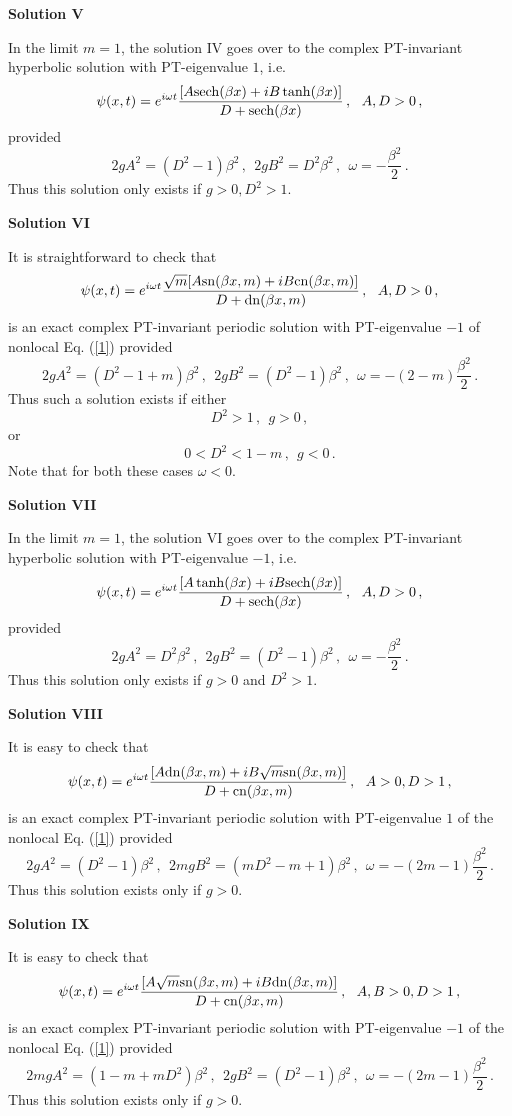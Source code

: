 \documentclass[11pt]{article}
\newcommand{\be}{\begin{equation}}
\newcommand{\ee}{\end{equation}}
\newcommand{\sn}{{\rm sn}}
\newcommand{\dn}{{\rm dn}}
\newcommand{\cn}{{\rm cn}}
\newcommand{\sech}{{\rm sech}}
\begin{document}
{\bf Solution V}

In the limit $m = 1$, the solution IV goes over to the complex 
PT-invariant hyperbolic solution with PT-eigenvalue $1$, i.e.
\be\label{15}
\psi(x,t) = e^{i\omega t} \frac{[A\sech(\beta x)+iB\tanh(\beta x)]}
{D+\sech(\beta x)}\,,~~A, D > 0\,,
\ee
provided
\be\label{16}
2g A^2 = (D^2-1)\beta^2\,,~~2 g B^2 = D^2\beta^2\,,~~
\omega = -\frac{\beta^2}{2}\,.
\ee
Thus this solution only exists if $g > 0, D^2 > 1$. 

{\bf Solution VI}

It is straightforward to check that 
\be\label{17}
\psi(x,t) = e^{i\omega t} \frac{\sqrt{m}[A\sn(\beta x,m)+iB\cn(\beta x,m)]}
{D+\dn(\beta x,m)}\,,~~A, D > 0\,,
\ee
is an exact complex PT-invariant periodic solution with PT-eigenvalue 
$-1$ of nonlocal Eq. (\ref{1}) provided
\be\label{18}
2g  A^2 = (D^2-1+m)\beta^2\,,~~2g B^2 = (D^2-1)\beta^2\,,~~
\omega = -(2-m)\frac{\beta^2}{2}\,.
\ee
Thus such a solution exists if either
\be\label{19}
D^2 > 1\,,~~g > 0\,,
\ee
or
\be\label{20}
0 < D^2 < 1-m\,,~~g < 0\,.
\ee
Note that for both these cases $\omega < 0$. 

{\bf Solution VII}

In the limit $m = 1$, the solution VI goes over to the complex 
PT-invariant hyperbolic solution with PT-eigenvalue $-1$, i.e.
\be\label{21}
\psi(x,t) = e^{i\omega t} \frac{[A\tanh(\beta x)+iB\sech(\beta x)]}
{D+\sech(\beta x)}\,,~~A, D > 0\,,
\ee
provided
\be\label{22}
2 g A^2 = D^2 \beta^2\,,~~2g B^2 = (D^2-1) \beta^2\,,~~
\omega = -\frac{\beta^2}{2}\,.
\ee
Thus this solution only exists if $g > 0$ and $D^2 > 1$. 

{\bf Solution VIII}

It is easy to check that 
\be\label{23}
\psi(x,t) = e^{i\omega t} \frac{[A\dn(\beta x,m)+iB\sqrt{m}\sn(\beta x,m)]}
{D+\cn(\beta x,m)}\,,~~A > 0, D > 1\,,
\ee
is an exact complex PT-invariant periodic solution with PT-eigenvalue 
$1$ of the nonlocal Eq. (\ref{1}) provided
\be\label{24}
2g A^2 = (D^2-1)\beta^2\,,~~2 m g B^2 = (m D^2-m+1)\beta^2\,,~~
\omega = -(2m-1)\frac{\beta^2}{2}\,.
\ee
Thus this solution exists only if $g > 0$. 

{\bf Solution IX}

It is easy to check that 
\be\label{25}
\psi(x,t) = e^{i\omega t}\frac{[A\sqrt{m}\sn(\beta x,m)+iB\dn(\beta x,m)]}
{D+\cn(\beta x,m)}\,,~~A,B > 0, D > 1\,,
\ee
is an exact complex PT-invariant periodic solution with PT-eigenvalue 
$-1$ of the nonlocal Eq. (\ref{1}) provided
\be\label{26}
2 m g A^2 = (1-m+m D^2)\beta^2\,,~~2 g B^2 = (D^2-1)\beta^2\,,~~
\omega = -(2m-1)\frac{\beta^2}{2}\,.
\ee
Thus this solution exists only if $g > 0$. 
\end{document}
